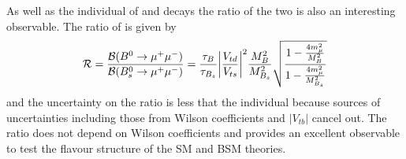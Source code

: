 {As well as the individual \BFs of \bdmumu and \bsmumu decays the ratio of the two \BFs is also an interesting observable. The ratio of \BFs is given by
\begin{equation}
  \mathcal{R} = \frac{\mathcal{B}(B^{0} \to \mu^{+} \mu^{-})}{\mathcal{B}(B^{0}_{s}\to \mu^{+} \mu^{-})} = \frac{\tau_{B}}{\tau_{B_{s}}} \bigg{|} \frac{V_{td}}{V_{ts}} \bigg{|}^{2} \frac{M_{B}^{2}}{M_{B_{s}}^{2}} \sqrt{\frac{1 - \frac{4m_{\mu}^{2}}{M^{2}_{B}}}{1- \frac{4m_{\mu}^{2}}{M^{2}_{B_{s}}}}} 
\label{eq:BF_ratio}
\end{equation}
and the uncertainty on the ratio is less that the individual \BFs because sources of uncertainties including those from Wilson coefficients and $|V_{tb}|$ cancel out. The ratio does not depend on Wilson coefficients and provides an excellent observable to test the flavour structure of the SM and BSM theories.


}
